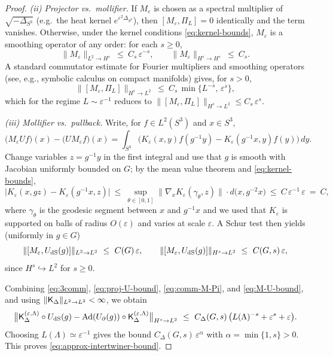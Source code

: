 \documentclass[10pt]{article}
\theoremstyle{definition}
\theoremstyle{plain}
\begin{document}
\begin{proof}
\smallskip
\emph{(ii) Projector vs.\ mollifier.}
If $M_\varepsilon$ is chosen as a spectral multiplier of $\sqrt{-\Delta_{S^3}}$ (e.g.\ the heat kernel $e^{\varepsilon^2\Delta_{S^3}}$), then $[M_\varepsilon,\Pi_L]=0$ identically and the term vanishes. Otherwise, under the kernel conditions \eqref{eq:kernel-bounds}, $M_\varepsilon$ is a smoothing operator of any order: for each $s\ge 0$,
\begin{equation}\label{eq:M-eps-smoothing}
\|M_\varepsilon\|_{L^2\to H^s}\ \le\ C_s\,\varepsilon^{-s},\qquad 
\|M_\varepsilon\|_{H^s\to H^s}\ \le\ C_s.
\end{equation}
A standard commutator estimate for Fourier multipliers and smoothing operators (see, e.g., symbolic calculus on compact manifolds) gives, for $s>0$,
\begin{equation}\label{eq:comm-M-Pi}
\|[M_\varepsilon,\Pi_L]\|_{H^s\to L^2}\ \le\ C_s\,\min\{L^{-s},\,\varepsilon^{s}\},
\end{equation}
which for the regime $L\sim\varepsilon^{-1}$ reduces to $\|[M_\varepsilon,\Pi_L]\|_{H^s\to L^2}\le C_s\,\varepsilon^{s}$.

\smallskip
\emph{(iii) Mollifier vs.\ pullback.}
Write, for $f\in L^2(S^3)$ and $x\in S^3$,
\[
\big(M_\varepsilon U f\big)(x)-\big(U M_\varepsilon f\big)(x)
=\int_{S^3}\!\Big(K_\varepsilon(x,y)f(g^{-1}y)-K_\varepsilon(g^{-1}x,y)f(y)\Big)\,dy.
\]
Change variables $z=g^{-1}y$ in the first integral and use that $g$ is smooth with Jacobian uniformly bounded on $G$; by the mean value theorem and \eqref{eq:kernel-bounds},
\[
\big|K_\varepsilon(x,g z)-K_\varepsilon(g^{-1}x,z)\big|
\ \le\ \sup_{\theta\in[0,1]}\|\nabla_x K_\varepsilon(\gamma_\theta,z)\|\cdot d\big(x,g^{-2}x\big)
\ \le\ C\,\varepsilon^{-1}\,\varepsilon\ =\ C,
\]
where $\gamma_\theta$ is the geodesic segment between $x$ and $g^{-1}x$ and we used that $K_\varepsilon$ is supported on balls of radius $O(\varepsilon)$ and varies at scale $\varepsilon$. A Schur test then yields (uniformly in $g\in G$)
\begin{equation}\label{eq:M-U-bound}
\|[M_\varepsilon,U_{\rm dS}(g)]\|_{L^2\to L^2}\ \le\ C(G)\,\varepsilon,\qquad 
\|[M_\varepsilon,U_{\rm dS}(g)]\|_{H^s\to L^2}\ \le\ C(G,s)\,\varepsilon,
\end{equation}
since $H^s\hookrightarrow L^2$ for $s\ge 0$.

\smallskip
Combining \eqref{eq:3comm}, \eqref{eq:proj-U-bound}, \eqref{eq:comm-M-Pi}, and \eqref{eq:M-U-bound}, and using $\|{\sf K}_\Delta\|_{L^2\to L^2}<\infty$, we obtain
\[
\big\|{\sf K}_\Delta^{(\varepsilon,\Lambda)} \circ U_{\rm dS}(g)
- \mathrm{Ad}(U_\partial(g))\circ {\sf K}_\Delta^{(\varepsilon,\Lambda)}\big\|_{H^s\to L^2}
\ \le\ C_\Delta(G,s)\,\big(L(\Lambda)^{-s}+\varepsilon^{s}+\varepsilon\big).
\]
Choosing $L(\Lambda)\simeq \varepsilon^{-1}$ gives the bound $C_\Delta(G,s)\,\varepsilon^\alpha$ with $\alpha=\min\{1,s\}>0$. This proves \eqref{eq:approx-intertwiner-bound}.
\end{proof}
\end{document}
